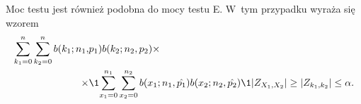 Moc testu jest również podobna do mocy testu E. W~tym przypadku wyraża się wzorem
\begin{equation}
\begin{split}
\sum_{k_1=0}^{n}\sum_{k_2=0}^{n} b(k_1;n_1,&p_1)b(k_2;n_2,p_2) \times \\
\times &\1{\sum_{x_1=0}^{n_1} \sum_{x_2=0}^{n_2} b(x_1;n_1,\hat{p_1}) b(x_2;n_2,\hat{p_2}) \1{|Z_{X_1,X_2}|\geq|Z_{k_1,k_2}|} \leq\alpha}.
\end{split}
\end{equation}

